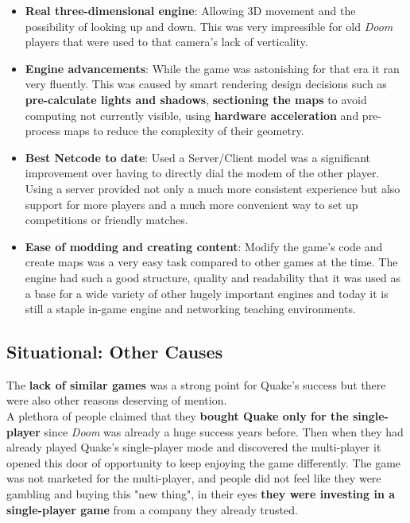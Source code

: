 \begin{itemize}
	\item \textbf{Real three-dimensional engine}: Allowing 3D movement and the possibility of looking up and down. This was very impressible for old \textit{Doom} players that were used to that camera's lack of verticality.
	\item \textbf{Engine advancements}: While the game was astonishing for that era it ran very fluently. This was caused by smart rendering design decisions such as \textbf{pre-calculate lights and shadows}, \textbf{sectioning the maps} to avoid computing not currently visible, using \textbf{hardware acceleration} and pre-process maps to reduce the complexity of their geometry.
	\item \textbf{Best Netcode to date}: Used a Server/Client model was a significant improvement over having to directly dial the modem of the other player. Using a server provided not only a much more consistent experience but also support for more players and a much more convenient way to set up competitions or friendly matches.
	\item \textbf{Ease of modding and creating content}: Modify the game's code and create maps was a very easy task compared to other games at the time. The engine had such a good structure, quality and readability that it was used as a base for a wide variety of other hugely important engines \parencite{engineFamily} and today it is still a staple in-game engine and networking teaching environments.
\end{itemize}

\subsection{Situational: Other Causes}

The \textbf{lack of similar games} was a strong point for Quake's success but there were also other reasons deserving of mention.\\

A plethora of people claimed that they \textbf{bought Quake only for the single-player} since \textit{Doom} was already a huge success years before. Then when they had already played Quake's single-player mode and discovered the multi-player it opened this door of opportunity to keep enjoying the game differently. The game was not marketed for the multi-player, and people did not feel like they were gambling and buying this "new thing", in their eyes \textbf{they were investing in a single-player game} from a company they already trusted.\\

